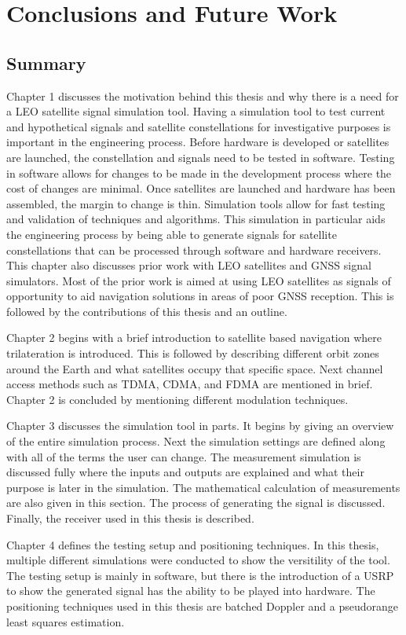 \documentclass[12pt]{report}
\begin{document}
\chapter{Conclusions and Future Work}
\section{Summary}
Chapter 1 discusses the motivation behind this thesis and why there is a need for a LEO satellite signal simulation tool. Having a simulation tool to test current and hypothetical signals and satellite constellations for investigative purposes is important in the engineering process. Before hardware is developed or satellites are launched, the constellation and signals need to be tested in software. Testing in software allows for changes to be made in the development process where the cost of changes are minimal. Once satellites are launched and hardware has been assembled, the margin to change is thin. Simulation tools allow for fast testing and validation of techniques and algorithms. This simulation in particular aids the engineering process by being able to generate signals for satellite constellations that can be processed through software and hardware receivers. This chapter also discusses prior work with LEO satellites and GNSS signal simulators. Most of the prior work is aimed at using LEO satellites as signals of opportunity to aid navigation solutions in areas of poor GNSS reception. This is followed by the contributions of this thesis and an outline. 

Chapter 2 begins with a brief introduction to satellite based navigation where trilateration is introduced. This is followed by describing different orbit zones around the Earth and what satellites occupy that specific space. Next channel access methods such as TDMA, CDMA, and FDMA are mentioned in brief. Chapter 2 is concluded by mentioning different modulation techniques. 

Chapter 3 discusses the simulation tool in parts. It begins by giving an overview of the entire simulation process. Next the simulation settings are defined along with all of the terms the user can change. The measurement simulation is discussed fully where the inputs and outputs are explained and what their purpose is later in the simulation. The mathematical calculation of measurements are also given in this section. The process of generating the signal is discussed. Finally, the receiver used in this thesis is described.

Chapter 4 defines the testing setup and positioning techniques. In this thesis, multiple different simulations were conducted to show the versitility of the tool. The testing setup is mainly in software, but there is the introduction of a USRP to show the generated signal has the ability to be played into hardware. The positioning techniques used in this thesis are batched Doppler and a pseudorange least squares estimation.
\end{document}
